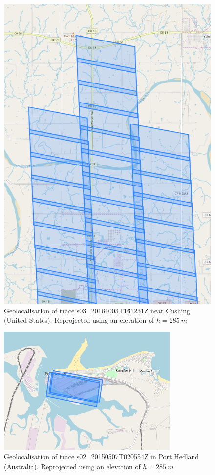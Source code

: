 \documentclass[paper=a4, fontsize=11pt, onecolumn, tikz, dvipsnames, svgnames, x11names]{article}
\begin{document}
\begin{figure}[H]
    \centering
    \includegraphics[height = 0.7\textheight]{trace_1Z.png}
    \caption{Geolocalisation of trace s03\_20161003T161231Z near Cushing (United States). Reprojected using an elevation of $h=285~m$}
    \label{fig_trace_1Z}
\end{figure}

\begin{figure}[H]
    \centering
    \includegraphics[width = 0.8\textwidth]{trace_video.png}
    \caption{Geolocalisation of trace s02\_20150507T020554Z in Port Hedland (Australia). Reprojected using an elevation of $h=285~m$}
    \label{fig_trace_video}
\end{figure}
\end{document}
